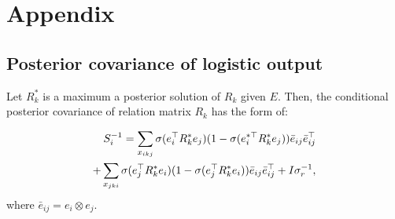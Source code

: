 \newpage
\section*{Appendix}
\subsection*{Posterior covariance of logistic output}
Let $R_k^*$ is a maximum a posterior solution of $R_k$ given $E$. Then, the conditional posterior covariance of relation matrix $R_k$ has the form of:

\begin{align}
S_i^{-1} = \sum_{x_{ikj}} \sigma(e_{i}^{\top} R_k^* e_{j}) (1 - \sigma(e_{i}^{*\top} R_k^* e_{j})) 
\bar{e}_{ij}\bar{e}_{ij}^\top \notag \\
 + \sum_{x_{jki}} \sigma(e_{j}^{\top} R_k^* e_{i}) ( 1- \sigma(e_{j}^{\top} R_k^* e_{i})) \bar{e}_{ij} \bar{e}_{ij}^\top + I\sigma_r^{-1}, \notag
\end{align}
where $\bar{e}_{ij} = e_i \otimes e_j$.

